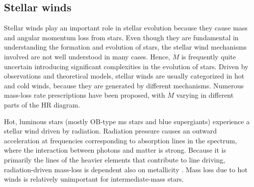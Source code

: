 \subsection{Stellar winds}\label{sub:winds}

Stellar winds play an important role in stellar evolution because they cause mass and angular momentum loss from stars. Even though they are fundamental in understanding the formation and evolution of stars, the stellar wind mechanisms involved are not well understood in many cases. Hence, $\dot{M}$ is frequently quite uncertain introducing significant complexities in the evolution of stars. Driven by observations and theoretical models, stellar winds are usually categorized in hot and cold winds, because they are generated by different mechanisms. Numerous mass-loss rate prescriptions have been proposed, with $\dot{M}$ varying in different parts of the HR diagram.

Hot, luminous stars (mostly OB-type \ac{ms} stars and blue supergiants) experience a stellar wind driven by radiation. Radiation pressure causes an outward acceleration at frequencies corresponding to absorption lines in the spectrum, where the interaction between photons and matter is strong. Because it is primarily the lines of the heavier elements that contribute to line driving, radiation-driven mass-loss is dependent also on metallicity \citep{vink2001mass}. Mass loss due to hot winds is relatively unimportant for intermediate-mass stars.

